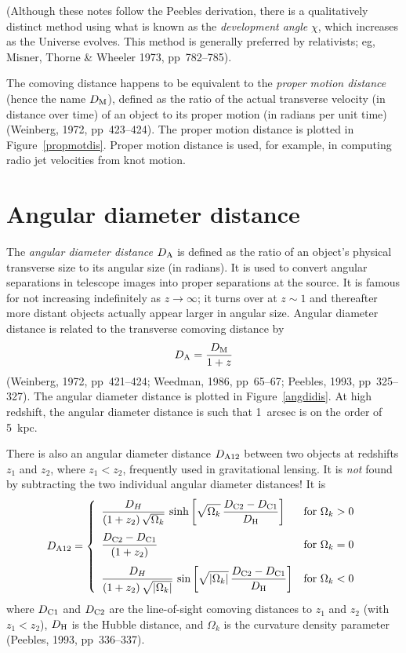 (Although these notes follow the Peebles derivation, there is a
qualitatively distinct method using what is known as the {\em
development angle\/} $\chi$, which increases as the Universe evolves.
This method is generally preferred by relativists; eg, Misner, Thorne
\& Wheeler 1973, pp~782--785).

The comoving distance happens to be equivalent to the {\em proper
motion distance\/} (hence the name $D_{\rm M}$), defined as the ratio
of the actual transverse velocity (in distance over time) of an object
to its proper motion (in radians per unit time) (Weinberg, 1972,
pp~423--424).  The proper motion distance is plotted in
Figure~\ref{propmotdis}.  Proper motion distance is used, for example,
in computing radio jet velocities from knot motion.


\section{Angular diameter distance}

The {\em angular diameter distance\/} $D_{\rm A}$ is defined as the
ratio of an object's physical transverse size to its angular size (in
radians).  It is used to convert angular separations in telescope
images into proper separations at the source.  It is famous for not
increasing indefinitely as $z\rightarrow\infty$; it turns over at
$z\sim 1$ and thereafter more distant objects actually appear larger
in angular size.  Angular diameter distance is related to the
transverse comoving distance by
\begin{equation}
D_{\rm A} = \frac{D_{\rm M}}{1+z}
\end{equation}
(Weinberg, 1972, pp~421--424; Weedman, 1986, pp~65--67; Peebles, 1993,
pp~325--327).  The angular diameter distance is plotted in
Figure~\ref{angdidis}.  At high redshift, the angular diameter
distance is such that 1~arcsec is on the order of 5~kpc.

There is also an angular diameter distance $D_{\rm A12}$ between two
objects at redshifts $z_1$ and $z_2$, where $z_1 < z_2$, frequently
used in gravitational lensing.  It is {\em not\/} found by subtracting
the two individual angular diameter distances!  It is
\begin{equation}
D_{\rm A12} = \left\{
\begin{array}{ll}
\displaystyle
\frac{D_H}{(1+z_2)\,\sqrt{\Omega_k}}\,\sinh\left[\sqrt{\Omega_k}
  \,\frac{D_{\rm C2}-D_{\rm C1}}{D_{\rm H}}\right]
  & {\rm for}~\Omega_k>0 \\[3ex]
\displaystyle
\frac{D_{\rm C2}-D_{\rm C1}}{(1+z_2)} & {\rm for}~\Omega_k=0 \\[3ex]
\displaystyle
\frac{D_H}{(1+z_2)\,\sqrt{|\Omega_k|}}\,\sin\left[\sqrt{|\Omega_k|}
  \,\frac{D_{\rm C2}-D_{\rm C1}}{D_{\rm H}}\right]
  & {\rm for}~\Omega_k<0
\end{array}
\right.
\end{equation}
where $D_{\rm C1}$ and $D_{\rm C2}$ are the line-of-sight comoving
distances to $z_1$ and $z_2$ (with $z_1 < z_2$), $D_{\rm H}$ is the
Hubble distance, and $\Omega_k$ is the curvature density parameter
(Peebles, 1993, pp~336--337).


